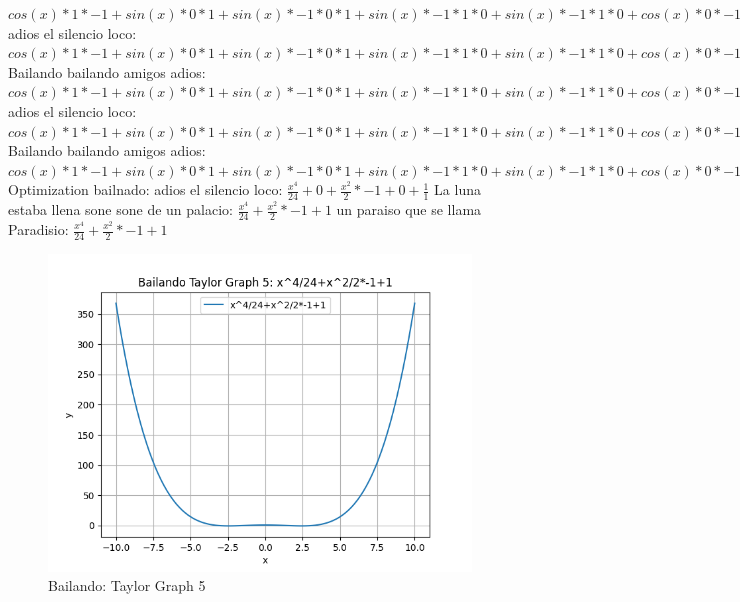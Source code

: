 \documentclass{article}
\begin{document}
${{{cos(x)*1*-1+sin(x)*0}*1+sin(x)*-1*0}*1+sin(x)*-1*1*0+sin(x)*-1*1*0+cos(x)*0}*-1+{sin(x)*-1*1*1+cos(x)*0}*0+{sin(x)*-1*1*1+cos(x)*0}*0+cos(x)*1*0$ adios el silencio loco: ${{{cos(x)*1*-1+sin(x)*0}*1+sin(x)*-1*0}*1+sin(x)*-1*1*0+sin(x)*-1*1*0+cos(x)*0}*-1+{sin(x)*-1*1*1+cos(x)*0}*0+{sin(x)*-1*1*1+cos(x)*0}*0+cos(x)*1*0+{sin(x)*-1*1*1+cos(x)*0}*0+cos(x)*1*0+cos(x)*1*0+sin(x)*0$ Bailando bailando amigos adios: ${{{{cos(x)*1*-1+sin(x)*0}*1+sin(x)*-1*0}*1+sin(x)*-1*1*0+sin(x)*-1*1*0+cos(x)*0}*-1+{sin(x)*-1*1*1+cos(x)*0}*0+{sin(x)*-1*1*1+cos(x)*0}*0+cos(x)*1*0+{sin(x)*-1*1*1+cos(x)*0}*0+cos(x)*1*0+cos(x)*1*0+sin(x)*0}*1+{{sin(x)*-1*1*1+cos(x)*0}*-1+cos(x)*1*0+cos(x)*1*0+sin(x)*0}*0$ adios el silencio loco: ${{{{cos(x)*1*-1+sin(x)*0}*1+sin(x)*-1*0}*1+sin(x)*-1*1*0+sin(x)*-1*1*0+cos(x)*0}*-1+{sin(x)*-1*1*1+cos(x)*0}*0+{sin(x)*-1*1*1+cos(x)*0}*0+cos(x)*1*0+{sin(x)*-1*1*1+cos(x)*0}*0+cos(x)*1*0+cos(x)*1*0+sin(x)*0}*1+{{sin(x)*-1*1*1+cos(x)*0}*-1+cos(x)*1*0+cos(x)*1*0+sin(x)*0}*0+{{sin(x)*-1*1*1+cos(x)*0}*-1+cos(x)*1*0+cos(x)*1*0+sin(x)*0}*0+{cos(x)*1*-1+sin(x)*0}*0$ Bailando bailando amigos adios: ${{{{cos(x)*1*-1+sin(x)*0}*1+sin(x)*-1*0}*1+sin(x)*-1*1*0+sin(x)*-1*1*0+cos(x)*0}*-1+{sin(x)*-1*1*1+cos(x)*0}*0+{sin(x)*-1*1*1+cos(x)*0}*0+cos(x)*1*0+{sin(x)*-1*1*1+cos(x)*0}*0+cos(x)*1*0+cos(x)*1*0+sin(x)*0}*1+{{sin(x)*-1*1*1+cos(x)*0}*-1+cos(x)*1*0+cos(x)*1*0+sin(x)*0}*0+{{sin(x)*-1*1*1+cos(x)*0}*-1+cos(x)*1*0+cos(x)*1*0+sin(x)*0}*0+{cos(x)*1*-1+sin(x)*0}*0+{{sin(x)*-1*1*1+cos(x)*0}*-1+cos(x)*1*0+cos(x)*1*0+sin(x)*0}*0+{cos(x)*1*-1+sin(x)*0}*0+{cos(x)*1*-1+sin(x)*0}*0+sin(x)*-1*0$  \newline \newline Optimization bailnado: \newline adios el silencio loco: $\frac{x^4}{24}+0+\frac{x^2}{2}*-1+0+\frac{1}{1}$  \newline La luna estaba llena sone sone de un palacio: $\frac{x^4}{24}+\frac{x^2}{2}*-1+1$  \newline un paraiso que se llama Paradisio: $\frac{x^4}{24}+\frac{x^2}{2}*-1+1$  \newline \begin{figure}
\centering
\includegraphics[width=0.8\linewidth]{Bailando Taylor Graph 5.png}
\caption{Bailando: Taylor Graph 5}
\label{fig:my_image}
\end{figure}
\end{document}
